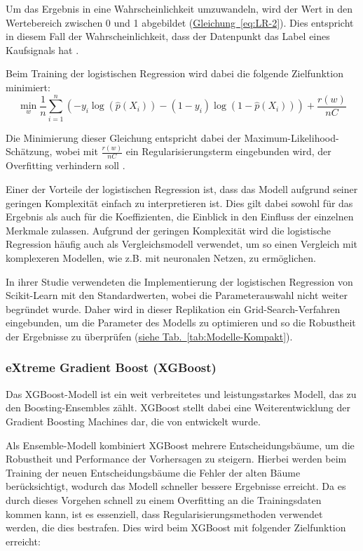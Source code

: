 \documentclass[a4paper, 12pt]{article}
\begin{document}
Um das Ergebnis in eine Wahrscheinlichkeit umzuwandeln, wird der Wert in den Wertebereich zwischen 0 und 1 abgebildet (\hyperref[eq:LR-2]{Gleichung~\ref*{eq:LR-2}}).
Dies entspricht in diesem Fall der Wahrscheinlichkeit, dass der Datenpunkt das Label eines Kaufsignals hat \parencite{Scikit-LR}.

Beim Training der logistischen Regression wird dabei die folgende Zielfunktion minimiert: 
\begin{equation}
	\min_{w} \frac{1}{n} \sum_{i=1}^n \left( -y_i \log (\hat p(X_i)) - (1-y_i)\log(1-\hat p (X_i)) \right) + \frac{r(w)}{nC}
\end{equation}

Die Minimierung dieser Gleichung entspricht dabei der Maximum-Likelihood-Schätzung, wobei mit $\frac{r(w)}{nC}$ ein Regularisierungsterm eingebunden wird, der Overfitting verhindern soll \parencite{Scikit-LR}.

Einer der Vorteile der logistischen Regression ist, dass das Modell aufgrund seiner geringen Komplexität einfach zu interpretieren ist.
Dies gilt dabei sowohl für das Ergebnis als auch für die Koeffizienten, die Einblick in den Einfluss der einzelnen Merkmale zulassen.
Aufgrund der geringen Komplexität wird die logistische Regression häufig auch als Vergleichsmodell verwendet, um so einen Vergleich mit komplexeren Modellen, wie z.B. mit neuronalen Netzen, zu ermöglichen.

In ihrer Studie verwendeten \textcite{Goutte2023} die Implementierung der logistischen Regression von Scikit-Learn mit den Standardwerten, wobei die Parameterauswahl nicht weiter begründet wurde.
Daher wird in dieser Replikation ein Grid-Search-Verfahren eingebunden, um die Parameter des Modells zu optimieren und so die Robustheit der Ergebnisse zu überprüfen (\hyperref[tab:Modelle-Kompakt]{siehe Tab.~\ref*{tab:Modelle-Kompakt}}).


\subsubsection{eXtreme Gradient Boost (XGBoost)}
Das XGBoost-Modell ist ein weit verbreitetes und leistungsstarkes Modell, das zu den Boosting-Ensembles zählt.
XGBoost stellt dabei eine Weiterentwicklung der Gradient Boosting Machines dar, die von \textcite{Chen2016} entwickelt wurde.

Als Ensemble-Modell kombiniert XGBoost mehrere Entscheidungsbäume, um die Robustheit und Performance der Vorhersagen zu steigern.
Hierbei werden beim Training der neuen Entscheidungsbäume die Fehler der alten Bäume berücksichtigt, wodurch das Modell schneller bessere Ergebnisse erreicht.
Da es durch dieses Vorgehen schnell zu einem Overfitting an die Trainingsdaten kommen kann, ist es essenziell, dass Regularisierungsmethoden verwendet werden, die dies bestrafen.
Dies wird beim XGBoost mit folgender Zielfunktion erreicht:
\end{document}
